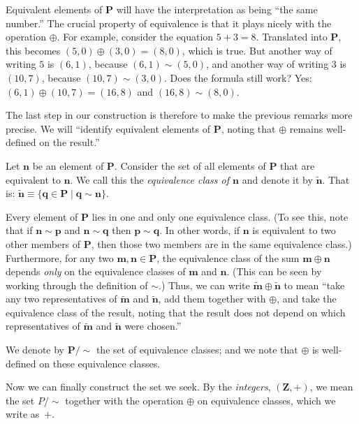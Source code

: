 \documentclass[10pt, a4paper, twocolumn]{article}
\newcommand{\set}[1]{\mathbold{#1}}
\newcommand{\pairs}{\set{P}}
\begin{document}
Equivalent elements of $\pairs$ will have the interpretation as being
``the same number.'' The crucial property of equivalence is that it
plays nicely with the operation $\oplus$. For example, consider the
equation $5+3=8$. Translated into $\pairs$, this becomes
$(5,0)\oplus(3,0)=(8,0)$, which is true. But another way of writing $5$ is
$(6,1)$, because $(6,1)\sim(5,0)$, and another way of writing $3$ is
$(10,7)$, because $(10,7)\sim(3,0)$. Does the formula still work? Yes:
$(6,1)\oplus(10,7)=(16,8)$ and $(16,8)\sim(8,0)$.

The last step in our construction is therefore to make the previous
remarks more precise. We will ``identify equivalent elements of
$\pairs$, noting that $\oplus$ remains well-defined on the result.'' 

Let $\mathbold{n}$ be an element of $\pairs$. Consider the set of all
elements of $\pairs$ that are equivalent to $\mathbold{n}$. We call
this the \emph{equivalence class of $\mathbold{n}$} and denote it by
$\tilde{\mathbold{n}}$. That is: $\tilde{\mathbold{n}} \equiv \{
\mathbold{q}\in\pairs \mid \mathbold{q}\sim\mathbold{n}\}$.

Every element of $\pairs$ lies in one and only one equivalence
class. (To see this, note that if $\mathbold{n}\sim\mathbold{p}$ and
$\mathbold{n}\sim\mathbold{q}$ then $\mathbold{p}\sim\mathbold{q}$. In other
words, if $\mathbold{n}$ is equivalent to two other members of
$\pairs$, then those two members are in the same equivalence class.)
Furthermore, for any two $\mathbold{m},\mathbold{n}\in\pairs$, the
equivalence class of the sum $\mathbold{m}\oplus\mathbold{n}$ depends
\emph{only} on the equivalence classes of $\mathbold{m}$ and
$\mathbold{n}$. (This can be seen by working through the definition of
$\sim$.) Thus, we can write $\tilde{\mathbold{m}}\oplus\tilde{\mathbold{n}}$
to mean ``take any two representatives of $\tilde{\mathbold{m}}$ and
$\tilde{\mathbold{n}}$, add them together with $\oplus$, and take the
equivalence class of the result, noting that the result does not
depend on which representatives of $\tilde{\mathbold{m}}$ and
$\tilde{\mathbold{n}}$ were chosen.''

We denote by $\pairs/{\sim}$ the set of equivalence classes; and we note
that $\oplus$ is well-defined on these equivalence classes.

Now we can finally construct the set we seek. By the \emph{integers},
$(\set{Z}, +)$, we mean the set $P/{\sim}$ together with the operation
$\oplus$ on equivalence classes, which we write as~$+$.
\end{document}
